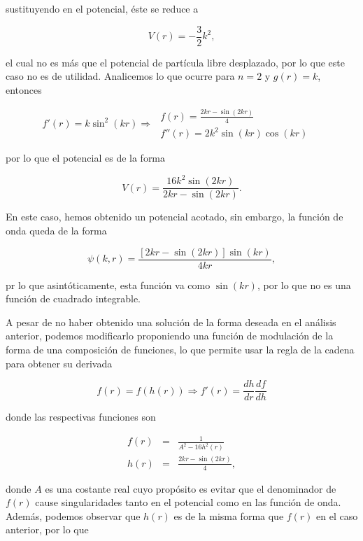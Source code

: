 sustituyendo en el potencial, éste se reduce a

\begin{equation*}
V(r)= -\frac{3}{2}k^2,
\end{equation*}

el cual no es más que el potencial de partícula libre desplazado, por lo que este caso no es de utilidad. Analicemos lo que ocurre para $n=2$ y $g(r)=k$, entonces

\begin{equation*}
f'(r) = k \sin^2(kr) \Rightarrow \,\, 
\begin{matrix}
f(r) = \frac{2 k r-\sin(2kr)}{4} & \,
\\
f''(r) = 2 k^2 \sin(kr) \cos(kr) & \,
\end{matrix}
\end{equation*}

por lo que el potencial es de la forma

\begin{equation*}
	V(r)=\frac{16 k^2 \sin(2kr)}{2 k r-\sin(2kr)}.
\end{equation*}

En este caso, hemos obtenido un potencial acotado, sin embargo, la función de onda queda de la forma

\begin{equation*}
\psi(k,r)=\frac{[2 k r-\sin(2kr)]\sin(kr)}{4 k r},
\end{equation*}

pr lo que asintóticamente, esta función va como $\sin(kr)$, por lo que no es una función de cuadrado integrable. 

A pesar  de no haber obtenido una solución de la forma deseada en el análisis anterior, podemos modificarlo proponiendo una función de modulación de la forma de una composición de funciones, lo que permite usar la regla de la cadena para obtener su derivada

\begin{equation*}
f(r) = f(h(r)) \Rightarrow f'(r) = \frac{dh}{dr} \frac{df}{dh} 
\end{equation*}

donde las respectivas funciones son

\begin{eqnarray*}
f(r) &=& \frac{1}{A^2 - 16h^2(r)}
\\
h(r) &=& \frac{2 k r-\sin(2kr)}{4},
\end{eqnarray*}

donde $A$ es una costante real cuyo propósito es evitar que el denominador de $f(r)$ cause singularidades tanto en el potencial como en las función de onda. Además, podemos observar que $h(r)$ es de la misma forma que $f(r)$ en el caso anterior, por lo que

